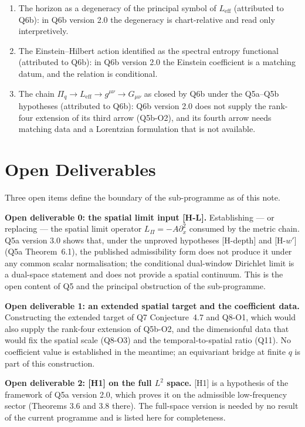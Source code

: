 \documentclass[11pt,a4paper]{article}
\theoremstyle{definition}
\newcommand{\Leff}{L_{\mathrm{eff}}}
\newcommand{\Lpi}{L_\Pi}
\newcommand{\geff}{g^{\mu\nu}}
\begin{document}
\begin{enumerate}
        \item The horizon as a degeneracy of the principal symbol of $\Leff$ (attributed to Q6b): in Q6b
        version 2.0 the degeneracy is chart-relative and read only interpretively.
        \item The Einstein--Hilbert action identified as the spectral entropy functional (attributed to Q6b):
        in Q6b version 2.0 the Einstein coefficient is a matching datum, and the relation is conditional.
        \item The chain $\Pi_q \to \Leff \to \geff \to G_{\mu\nu}$ as closed by Q6b under the Q5a--Q5b hypotheses
        (attributed to Q6b): Q6b version 2.0 does not supply the rank-four extension of its third arrow (Q5b-O2), and
        its fourth arrow needs matching data and a Lorentzian formulation that is not available.
      \end{enumerate}

  \section{Open Deliverables}
    \label{sec:open}

    Three open items define the boundary of the sub-programme as of this note.

    \textbf{Open deliverable 0: the spatial limit input [H-L].}
    Establishing --- or replacing --- the spatial limit operator $\Lpi = -A\partial_x^2$
    consumed by the metric chain.
    Q5a version 3.0 shows that, under the unproved hypotheses [H-depth] and [H-$w'$] (Q5a
    Theorem~6.1), the published admissibility form does not produce it under any common scalar
    normalisation; the conditional dual-window Dirichlet limit is a dual-space
    statement and does not provide a spatial continuum.
    This is the open content of Q5 and the principal obstruction of the sub-programme.

    \textbf{Open deliverable 1: an extended spatial target and the coefficient data.}
    Constructing the extended target of Q7 Conjecture~4.7 and Q8-O1, which would also supply
    the rank-four extension of Q5b-O2, and the dimensionful data that would fix the spatial
    scale (Q8-O3) and the temporal-to-spatial ratio (Q11).
    No coefficient value is established in the meantime; an equivariant bridge at finite $q$ is
    part of this construction.

    \textbf{Open deliverable 2: [H1] on the full $L^2$ space.}
    [H1] is a hypothesis of the framework of Q5a version 2.0, which proves it on the admissible
    low-frequency sector (Theorems 3.6 and 3.8 there).
    The full-space version is needed by no result of the current programme and is listed here for
    completeness.
\end{document}

